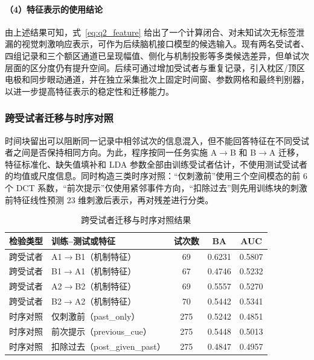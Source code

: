 \documentclass[a4paper,zihao=-4,linespread=1]{ctexart}
\numberwithin{figure}{section}       %
\begin{document}
\paragraph{（4）特征表示的使用结论}

由上述结果可知，式~\eqref{eq:q2_feature} 给出了一个计算闭合、对未知试次无标签泄漏的视觉刺激响应表示，可作为后续脑机接口模型的候选输入。现有两名受试者、四组记录和三个额区通道已呈现幅值、侧化与机制投影等多类候选差异，但单试次层面的区分度仍有提升空间。后续可通过增加受试者与重复记录，引入枕区/顶区电极和同步眼动通道，并在独立采集批次上固定时间窗、参数网格和最终判别器，以进一步提高特征表示的稳定性和迁移能力。

\subsubsection{跨受试者迁移与时序对照}

时间块留出可以阻断同一记录中相邻试次的信息混入，但不能回答特征在不同受试者之间是否保持相同方向。为此，程序按同一任务实施 A$\rightarrow$B 和 B$\rightarrow$A 迁移，特征标准化、缺失值填补和 LDA 参数全部由训练受试者估计，不使用测试受试者的均值或尺度信息。同时构造三类时序对照：“仅刺激前”使用三个空间模态的前 6 个 DCT 系数，“前次提示”仅使用紧邻事件方向，“扣除过去”则先用训练块的刺激前特征线性预测 23 维刺激后表示，再对残差进行分类。

\begin{table}[H]
\centering
\caption{跨受试者迁移与时序对照结果}
\label{tab:q2_transfer_sequence}
\small
\begin{tabular}{llccc}
\toprule
\textbf{检验类型} & \textbf{训练--测试或特征} & \textbf{试次数} & \textbf{BA} & \textbf{AUC} \\
\midrule
跨受试者 & A1$\rightarrow$B1（机制特征） & 69 & 0.6231 & 0.5807 \\
跨受试者 & B1$\rightarrow$A1（机制特征） & 67 & 0.4746 & 0.5232 \\
跨受试者 & A2$\rightarrow$B2（机制特征） & 69 & 0.5557 & 0.5270 \\
跨受试者 & B2$\rightarrow$A2（机制特征） & 70 & 0.5442 & 0.5341 \\
\midrule
时序对照 & 仅刺激前（past\_only） & 275 & 0.5242 & 0.4851 \\
时序对照 & 前次提示（previous\_cue） & 275 & 0.5448 & 0.5013 \\
时序对照 & 扣除过去（post\_given\_past） & 275 & 0.4847 & 0.4957 \\
\bottomrule
\end{tabular}
\end{table}
\end{document}
